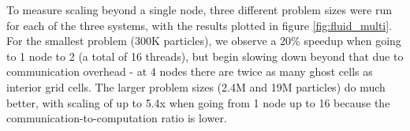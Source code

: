 To measure scaling beyond a single node, three different problem sizes were run for each of the three systems,
 with the results plotted in figure
\ref{fig:fluid_multi}.  For the smallest problem (300K particles), we observe a 20\% speedup when going to 1
node to 2 (a total of 16 threads), but begin slowing down beyond that due to communication overhead - at 4 nodes
there are twice as many ghost cells as interior grid cells.  The larger problem sizes (2.4M and 19M
particles) do much better, with scaling of up to 5.4x when going from 1 node up to 16 because the
communication-to-computation ratio is lower.


